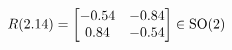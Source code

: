 \documentclass[preview]{standalone}
\begin{document}
\begin{align*}
\special{dvisvgm:raw <g id='unique000'>}R(2.14) = \begin{bmatrix} -0.54 & -0.84 \\ 0.84 & -0.54 \end{bmatrix} \in \text{SO}(2)\special{dvisvgm:raw </g>}
\end{align*}
\end{document}

